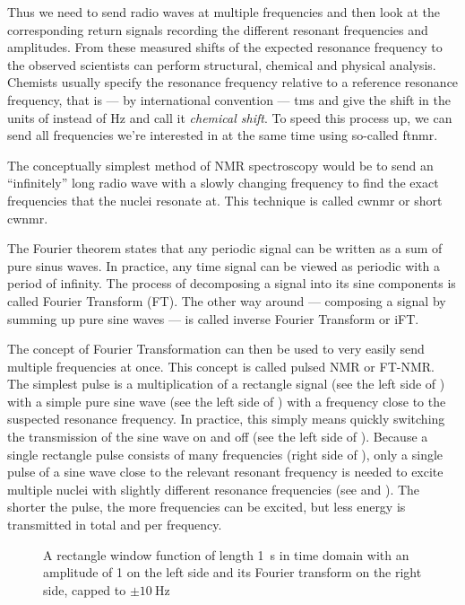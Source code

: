 Thus we need to send radio waves at multiple frequencies and then look at the corresponding return signals recording the different resonant frequencies and amplitudes. From these measured shifts of the expected resonance frequency to the observed scientists can perform structural, chemical and physical analysis. Chemists usually specify the resonance frequency relative to a reference resonance frequency, that is --- by international convention --- \acrshort{tms} and give the shift in the units of \unit{\partspermillion} instead of \unit{\hertz} and call it \emph{chemical shift}. To speed this process up, we can send all frequencies we're interested in at the same time using so-called \acrshort{ftnmr}.

The conceptually simplest method of NMR spectroscopy would be to send an \enquote{infinitely} long radio wave with a slowly changing frequency to find the exact frequencies that the nuclei resonate at. This technique is called \acrlong{cwnmr} or short \acrshort{cwnmr}.

The Fourier theorem states that any periodic signal can be written as a sum of pure sinus waves. In practice, any time signal can be viewed as periodic with a period of infinity. The process of decomposing a signal into its sine components is called Fourier Transform (FT). The other way around --- composing a signal by summing up pure sine waves --- is called inverse Fourier Transform or iFT.

The concept of Fourier Transformation can then be used to very easily send multiple frequencies at once. This concept is called pulsed NMR or FT-NMR. The simplest pulse is a multiplication of a rectangle signal (see the left side of ) with a simple pure sine wave (see the left side of ) with a frequency close to the suspected resonance frequency. In practice, this simply means quickly switching the transmission of the sine wave on and off (see the left side of ). Because a single rectangle pulse consists of many frequencies (right side of ), only a single pulse of a sine wave close to the relevant resonant frequency is needed to excite multiple nuclei with slightly different resonance frequencies (see  and ). The shorter the pulse, the more frequencies can be excited, but less energy is transmitted in total and per frequency.
\begin{figure}[htb]
    
    \caption{A rectangle window function of length \qty{1}{\second} in time domain with an amplitude of 1 on the left side and its Fourier transform on the right side, capped to \(\pm{}\qty{10}{\hertz}\)}
\end{figure}

